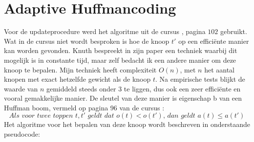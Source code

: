 \section{Adaptive Huffmancoding}
Voor de updateprocedure werd het algoritme uit de cursus \cite{ad3cursus}, pagina $102$ gebruikt. Wat in de cursus niet wordt besproken is hoe de knoop $t'$ op een effici\"ente manier kan worden gevonden. Knuth bespreekt in zijn paper \cite{knuthhuffman} een techniek waarbij dit mogelijk is in constante tijd, maar zelf bedacht ik een andere manier om deze knoop te bepalen. Mijn techniek heeft complexiteit $O(n)$, met $n$ het aantal knopen met exact hetzelfde gewicht als de knoop $t$. Na empirische tests blijkt de waarde van $n$ gemiddeld steeds onder $3$ te liggen, dus ook een zeer effici\"ente en vooral gemakkelijke manier. De sleutel van deze manier is eigenschap b van een Huffman boom, vermeld op pagina $96$ van de cursus \cite{ad3cursus}:
$$\textit{Als voor twee toppen }t, t'\textit{ geldt dat }o(t) < o(t')\textit{, dan geldt }a(t) \leq a(t')$$
Het algoritme voor het bepalen van deze knoop wordt beschreven in onderstaande pseudocode: